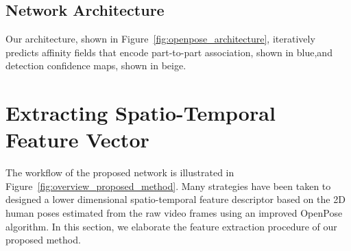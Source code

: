 \subsection{Network Architecture}
Our architecture, shown in Figure~\ref{fig:openpose_architecture}, iteratively predicts affinity fields  that  encode  part-to-part  association,  shown  in  blue,and  detection  confidence  maps,  shown  in  beige. 


\section{Extracting Spatio-Temporal Feature Vector}
The workflow of the proposed network is illustrated in Figure~\ref{fig:overview_proposed_method}. Many strategies have been taken to designed a lower dimensional spatio-temporal feature descriptor based on the 2D human poses estimated from the raw video frames using an improved OpenPose~\cite{Cao_19} algorithm. In this section, we elaborate the feature extraction procedure of our proposed method. 

